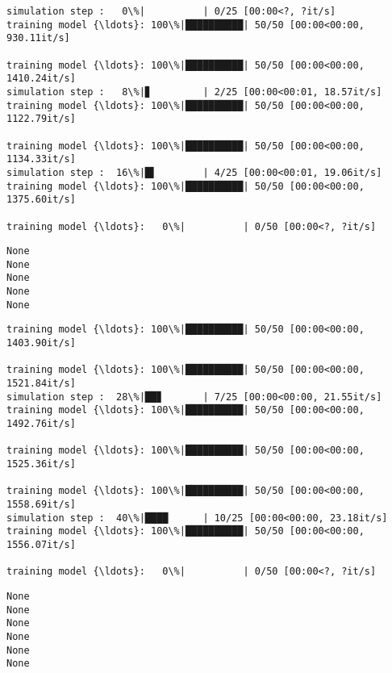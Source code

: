 \documentclass[11pt]{article}
\begin{document}
    \begin{Verbatim}[commandchars=\\\{\}]
simulation step :   0\%|          | 0/25 [00:00<?, ?it/s]
training model {\ldots}: 100\%|██████████| 50/50 [00:00<00:00, 930.11it/s]

training model {\ldots}: 100\%|██████████| 50/50 [00:00<00:00, 1410.24it/s]
simulation step :   8\%|▊         | 2/25 [00:00<00:01, 18.57it/s]
training model {\ldots}: 100\%|██████████| 50/50 [00:00<00:00, 1122.79it/s]

training model {\ldots}: 100\%|██████████| 50/50 [00:00<00:00, 1134.33it/s]
simulation step :  16\%|█▌        | 4/25 [00:00<00:01, 19.06it/s]
training model {\ldots}: 100\%|██████████| 50/50 [00:00<00:00, 1375.60it/s]

training model {\ldots}:   0\%|          | 0/50 [00:00<?, ?it/s]
    \end{Verbatim}

    \begin{Verbatim}[commandchars=\\\{\}]
None
None
None
None
None
    \end{Verbatim}

    \begin{Verbatim}[commandchars=\\\{\}]
training model {\ldots}: 100\%|██████████| 50/50 [00:00<00:00, 1403.90it/s]

training model {\ldots}: 100\%|██████████| 50/50 [00:00<00:00, 1521.84it/s]
simulation step :  28\%|██▊       | 7/25 [00:00<00:00, 21.55it/s]
training model {\ldots}: 100\%|██████████| 50/50 [00:00<00:00, 1492.76it/s]

training model {\ldots}: 100\%|██████████| 50/50 [00:00<00:00, 1525.36it/s]

training model {\ldots}: 100\%|██████████| 50/50 [00:00<00:00, 1558.69it/s]
simulation step :  40\%|████      | 10/25 [00:00<00:00, 23.18it/s]
training model {\ldots}: 100\%|██████████| 50/50 [00:00<00:00, 1556.07it/s]

training model {\ldots}:   0\%|          | 0/50 [00:00<?, ?it/s]
    \end{Verbatim}

    \begin{Verbatim}[commandchars=\\\{\}]
None
None
None
None
None
None
    \end{Verbatim}
\end{document}
